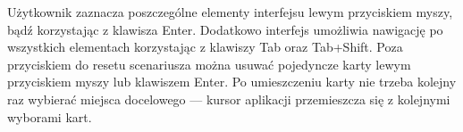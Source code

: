 Użytkownik zaznacza poszczególne elementy interfejsu lewym przyciskiem myszy, bądź korzystając z klawisza Enter. Dodatkowo interfejs umożliwia nawigację po wszystkich elementach korzystając z klawiszy Tab oraz Tab+Shift. Poza przyciskiem do resetu scenariusza można usuwać pojedyncze karty lewym przyciskiem myszy lub klawiszem Enter. Po umieszczeniu karty nie trzeba kolejny raz wybierać miejsca docelowego --- kursor aplikacji przemieszcza się z kolejnymi wyborami kart.
